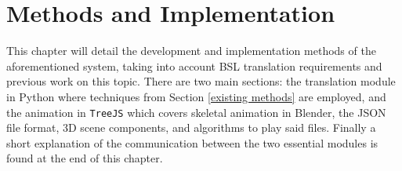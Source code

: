 \documentclass[12pt]{ociamthesis}  %
\newcommand{\tech}{\texttt}
\begin{document}


\chapter{Methods and Implementation}
\label{implementation}

This chapter will detail the development and implementation methods of the aforementioned system, taking into account BSL translation requirements and previous work on this topic. There are two main sections: the translation module in Python where techniques from Section \ref{existing methods} are employed, and the animation in \tech{TreeJS} which covers skeletal animation in Blender, the JSON file format, 3D scene components, and algorithms to play said files. Finally a short explanation of the communication between the two essential modules is found at the end of this chapter.
\end{document}
